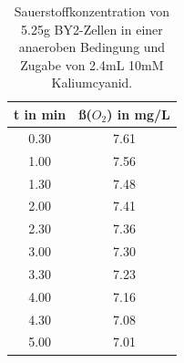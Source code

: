 \documentclass[10pt,a4paper]{article}
\begin{document}
	\begin{table}[H]
		\centering
		\caption{Sauerstoffkonzentration von 5.25g BY2-Zellen in einer anaeroben Bedingung und Zugabe von 2.4mL 10mM Kaliumcyanid.}
		\label{tab:O2 BY2 mit KCN}
		\begin{tabular}{cc}
			\toprule
			t in min& ß($O_2$) in mg/L\\
			\midrule
			0.30 & 7.61\\
			1.00 & 7.56\\
			1.30 & 7.48\\
			2.00 & 7.41\\
			2.30 & 7.36 \\
			3.00 & 7.30 \\
			3.30 & 7.23 \\
			4.00 & 7.16\\
			4.30 & 7.08\\
			5.00 & 7.01 \\
			\bottomrule
		\end{tabular}
	\end{table}	
	
	
\end{document}
